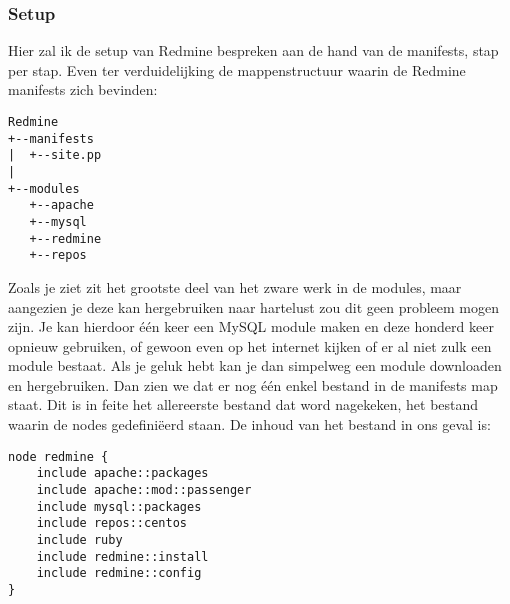 \subsubsection{Setup}
Hier zal ik de setup van Redmine bespreken aan de hand van de manifests, stap per stap. Even ter verduidelijking de mappenstructuur waarin de Redmine manifests zich bevinden:
%
\begin{code}
\begin{lstlisting}
Redmine
+--manifests
|  +--site.pp
|
+--modules
   +--apache
   +--mysql
   +--redmine
   +--repos
\end{lstlisting}
\end{code}
%
Zoals je ziet zit het grootste deel van het zware werk in de modules, maar aangezien je deze kan hergebruiken naar hartelust zou dit geen probleem mogen zijn. Je kan hierdoor \'e\'en keer een MySQL module maken en deze honderd keer opnieuw gebruiken, of gewoon even op het internet kijken of er al niet zulk een module bestaat. Als je geluk hebt kan je dan simpelweg een module downloaden en hergebruiken. Dan zien we dat er nog \'e\'en enkel bestand in de manifests map staat. Dit is in feite het allereerste bestand dat word nagekeken, het bestand waarin de nodes gedefini\"eerd staan. De inhoud van het bestand in ons geval is:
%
\begin{code}
\begin{lstlisting}
node redmine {
	include apache::packages
	include apache::mod::passenger
	include mysql::packages
	include repos::centos
	include ruby
	include redmine::install
	include redmine::config
}
\end{lstlisting}
\end{code}
%

